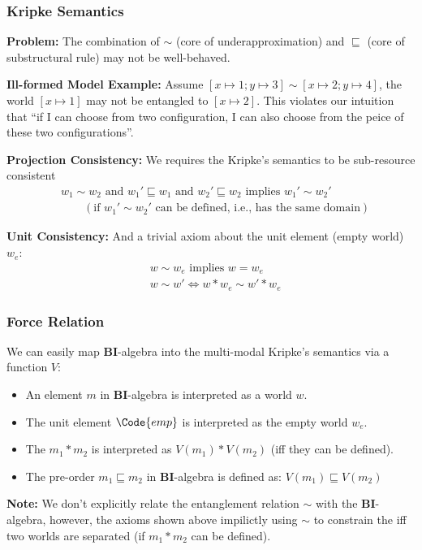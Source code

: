 \begin{frame}[fragile]
    \frametitle{Kripke Semantics}

\textbf{Problem:} The combination of $\sim$ (core of underapproximation) and $\sqsubseteq$ (core of substructural rule) may not be well-behaved.

\textbf{Ill-formed Model Example:} Assume $[x\mapsto 1; y \mapsto 3] \sim [x\mapsto 2; y \mapsto 4]$, the world $[x\mapsto 1]$ may not be entangled to $[x\mapsto 2]$. This violates our intuition that ``if I can choose from two configuration, I can also choose from the peice of these two configurations''.


\textbf{Projection Consistency:} We requires the Kripke's semantics to be sub-resource consistent
\begin{align*}
    &w_1 \sim w_2 \text{ and } w_1' \sqsubseteq w_1 \text{ and } w_2' \sqsubseteq w_2 \text{ implies } w_1' \sim w_2' 
    \\&\qquad (\text{if $w_1' \sim w_2'$ can be defined, i.e., has the same domain})
\end{align*}\noindent

\textbf{Unit Consistency:} And a trivial axiom about the unit element (empty world) $w_e$:
\begin{align*}
    &w \sim w_e \text{ implies } w = w_e
    \\&w \sim w' \iff w * w_e \sim w' * w_e
\end{align*}\noindent


\end{frame}

\begin{frame}[fragile]
    \frametitle{Force Relation}
We can easily map \textbf{BI}-algebra into the multi-modal Kripke's semantics via a function $V$:
\begin{itemize}
    \item An element $m$ in \textbf{BI}-algebra is interpreted as a world $w$.
    \item The unit element $\Code{emp}$ is interpreted as the empty world $w_e$.
    \item The $m_1 * m_2$ is interpreted as $V(m_1) * V(m_2)$ (iff they can be defined).
    \item The pre-order $m_1 \sqsubseteq m_2$ in \textbf{BI}-algebra is defined as: $V(m_1) \sqsubseteq V(m_2)$
\end{itemize}

\textbf{Note:} We don't explicitly relate the entanglement relation $\sim$ with the \textbf{BI}-algebra, however, the axioms shown above impilictly using $\sim$ to constrain the iff two worlds are separated (if $m_1 * m_2$ can be defined).

\end{frame}

